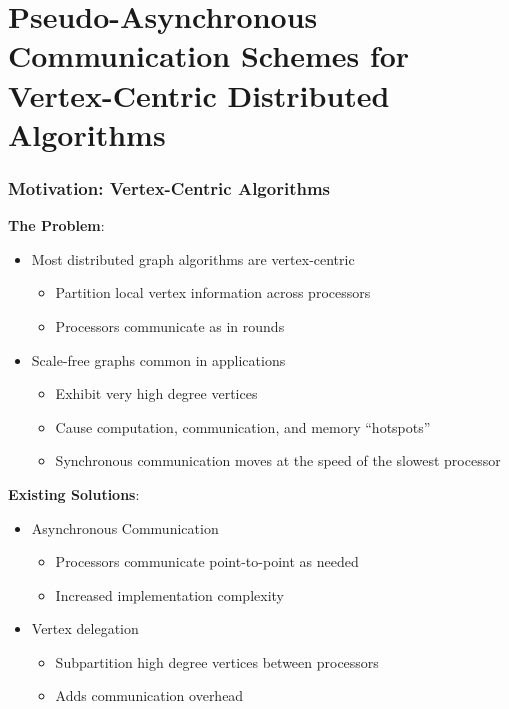 \documentclass{beamer}
\begin{document}








\section{Pseudo-Asynchronous Communication Schemes for Vertex-Centric Distributed Algorithms}

\begin{frame}
\frametitle{Motivation: Vertex-Centric Algorithms}

\textbf{The Problem}:
\begin{itemize}
	\item Most distributed graph algorithms are vertex-centric
	\begin{itemize}
		\item Partition local vertex information across processors
		\item Processors communicate as in rounds \cite{malewicz2010pregel}
	\end{itemize}
	\item Scale-free graphs common in applications
	\begin{itemize}
		\item Exhibit very high degree vertices
		\item Cause computation, communication, and memory ``hotspots''
		\item Synchronous communication moves at the speed of the slowest processor
	\end{itemize}
\end{itemize}

\textbf{Existing Solutions}:
\begin{itemize}
	\item Asynchronous Communication 
	\begin{itemize}
		\item Processors communicate point-to-point as needed
		\item Increased implementation complexity
	\end{itemize}
	\item Vertex delegation \cite{pearce2014faster}
	\begin{itemize}
		\item Subpartition high degree vertices between processors
		\item Adds communication overhead
	\end{itemize}
\end{itemize}


\end{frame}
\end{document}
